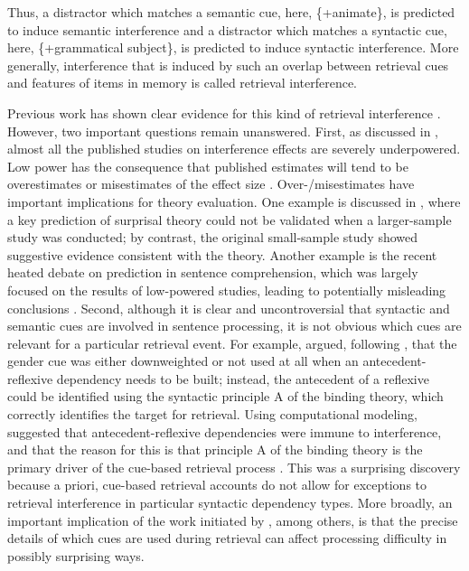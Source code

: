 \documentclass[a4paper, man, floatsintext]{apa7}
\begin{document}
Thus, a distractor which matches a semantic cue, here, \{+animate\}, is predicted to induce semantic interference and a distractor which matches a syntactic cue, here, \{+grammatical subject\}, is predicted to induce syntactic interference. More generally, interference that is induced by such an overlap between retrieval cues and features of items in memory is called retrieval interference. 

Previous work has shown clear evidence for this kind of retrieval interference \parencite{vandyke07, vandyke_mcelree06, vandyke_mcelree2011, nicenboim,  vandyke_lewis03,jaeger_etal_2017}.
However, two important questions remain unanswered. First, as discussed in \cite{jaeger_etal_2017}, almost all the published studies on interference effects are severely underpowered. Low power has the consequence that published estimates will tend to be overestimates or misestimates of the effect size \parencite{vasishth2018_signficancefilter}. Over-/misestimates have important implications for theory evaluation. One example is discussed in \cite{vasishth2018_signficancefilter}, where a key prediction of surprisal theory \parencite{levy&keller_2013} could not be validated when a larger-sample study was conducted; by contrast, the original small-sample study  \parencite{levy&keller_2013} showed suggestive evidence consistent with the theory. Another example is the recent heated debate on prediction in sentence comprehension, which was largely focused on the results of low-powered studies, leading to potentially misleading conclusions \parencite{nicenboim_etal_2020}.
Second, although it is clear and uncontroversial  \parencite[e.g.,][]{vandyke07,mertzen} that syntactic and semantic cues are involved in sentence processing, it is not obvious which cues are relevant for a particular retrieval event. For example, \cite{dillon2013} argued, following \cite{Sturt2003}, that the gender cue was either downweighted or not used at all when an antecedent-reflexive dependency needs to be built; instead, the antecedent of a reflexive could be identified using the syntactic principle A of the binding theory, which correctly identifies the target for retrieval.  Using computational modeling, \cite{dillon2013} suggested that antecedent-reflexive dependencies were immune to interference, and that the reason for this is that principle A of the binding theory is the primary driver of the cue-based retrieval process \parencite[cf. ][]{jaeger_etal_2020,yadav2021individual}. This was a surprising discovery because a priori, cue-based retrieval accounts do not allow for exceptions to retrieval interference in particular syntactic dependency types.
More broadly, an important implication of the work initiated by \cite{dillon2013}, among others, is that  the precise details of which cues are used during retrieval can affect processing difficulty in possibly surprising ways.
\end{document}
